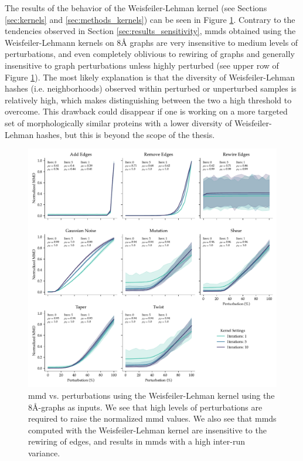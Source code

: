 The results of the behavior of the Weisfeiler-Lehman kernel (see Sections
\ref{sec:kernels} and \ref{sec:methods_kernels}) can be seen in Figure
\ref{fig:wlk}. Contrary to the tendencies observed in Section
\ref{sec:results_sensitivity}, \acrshort{mmd}s obtained using the Weisfeiler-Lehmann
kernels on 8\si{\angstrom} graphs are very insensitive to medium levels of perturbations,
and even completely oblivious to rewiring of graphs and generally insensitive to
graph perturbations unless highly perturbed (see upper row of Figure \ref{fig:wlk}). The most likely explanation
is that the diversity of Weisfeiler-Lehman hashes (i.e. neighborhoods) observed within perturbed or
unperturbed samples is relatively high, which makes distinguishing between the
two a high threshold to overcome. This drawback could disappear if one is working on
a more targeted set of morphologically similar proteins with a lower diversity
of Weisfeiler-Lehman hashes, but this is beyond the scope of the thesis.

\begin{figure}
  \includegraphics[width=\textwidth]{./figures/results/res_3.pdf}
  \caption[Normalized \acrshort{mmd} values using the Weisfeiler-Lehman kernel subject to
  various perturbations.]{\acrshort{mmd} vs.
perturbations using the Weisfeiler-Lehman kernel using the
8\si{\angstrom}-graphs as inputs. We see that high levels of perturbations are
required to raise the normalized \acrshort{mmd} values. We also see that \acrshort{mmd}s computed with
the Weisfeiler-Lehman kernel are insensitive to the rewiring of edges, and
results in \acrshort{mmd}s with a high inter-run variance.}
  \label{fig:wlk}
\end{figure}

